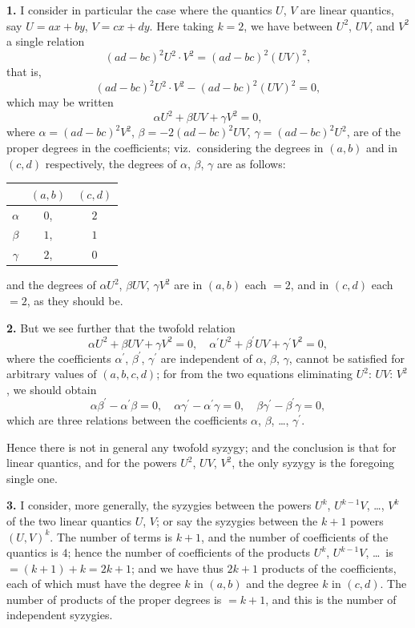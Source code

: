 \documentclass[11pt,a4paper]{book}
\begin{document}
\textbf{1.} I consider in particular the case where the quantics $U$, $V$ are linear quantics,
say $U = ax + by$, $V = cx + dy$. Here taking $k = 2$, we have between $U^2$, $UV$,
and $V^2$ a single relation
\[
(ad - bc)^2 U^2 \cdot V^2 = (ad - bc)^2 (UV)^2,
\]
that is,
\[
(ad - bc)^2 U^2 \cdot V^2 - (ad - bc)^2 (UV)^2 = 0,
\]
which may be written
\[
\alpha U^2 + \beta UV + \gamma V^2 = 0,
\]
where $\alpha = (ad - bc)^2 V^2$, $\beta = -2(ad - bc)^2 UV$, $\gamma = (ad - bc)^2 U^2$, are of the
proper degrees in the coefficients; viz.~considering the degrees in $(a, b)$ and in
$(c, d)$ respectively, the degrees of $\alpha$, $\beta$, $\gamma$ are as follows:
\begin{center}
\begin{tabular}{c|cc}
& $(a, b)$ & $(c, d)$ \\
\hline
$\alpha$ & $0$, & $2$ \\
$\beta$ & $1$, & $1$ \\
$\gamma$ & $2$, & $0$
\end{tabular}
\end{center}
and the degrees of $\alpha U^2$, $\beta UV$, $\gamma V^2$ are in $(a, b)$ each $= 2$, and in $(c, d)$
each $= 2$, as they should be.

\newpage
\textbf{2.} But we see further that the twofold relation
\[
\alpha U^2 + \beta UV + \gamma V^2 = 0, \quad \alpha^\prime U^2 + \beta^\prime UV + \gamma^\prime V^2 = 0,
\]
where the coefficients $\alpha^\prime$, $\beta^\prime$, $\gamma^\prime$ are independent of $\alpha$, $\beta$, $\gamma$, cannot be satisfied
for arbitrary values of $(a, b, c, d)$; for from the two equations eliminating $U^2$:
$UV$:
$V^2$, we should obtain
\[
\alpha\beta^\prime - \alpha^\prime\beta = 0, \quad \alpha\gamma^\prime - \alpha^\prime\gamma = 0, \quad \beta\gamma^\prime - \beta^\prime\gamma = 0,
\]
which are three relations between the coefficients $\alpha$, $\beta$, \ldots, $\gamma^\prime$.

Hence there is not in general any twofold syzygy; and the conclusion is that
for linear quantics, and for the powers $U^2$, $UV$, $V^2$, the only syzygy is the foregoing
single one.

\textbf{3.} I consider, more generally, the syzygies between the powers $U^k$,
$U^{k-1}V$, \ldots, $V^k$ of the two linear quantics $U$, $V$; or say the syzygies between the
$k + 1$ powers $(U, V)^k$. The number of terms is $k + 1$, and the number of
coefficients of the quantics is $4$; hence the number of coefficients of the products
$U^k$, $U^{k-1}V$, \ldots\ is $= (k + 1) + k = 2k + 1$; and we have thus $2k + 1$ products of
the coefficients, each of which must have the degree $k$ in $(a, b)$ and the degree $k$
in $(c, d)$. The number of products of the proper degrees is $= k + 1$, and this is the
number of independent syzygies.
\end{document}
